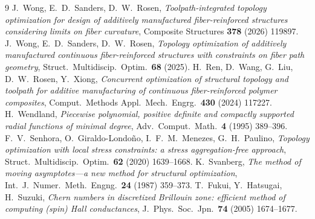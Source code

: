 \documentclass[11pt]{article}
\begin{document}
\begin{thebibliography}{9}
 J.~Wong, E.~D.~Sanders, D.~W.~Rosen,
  \emph{Toolpath-integrated topology optimization for design of additively
  manufactured fiber-reinforced structures considering limits on fiber
  curvature}, Composite Structures \textbf{378} (2026) 119897.
 J.~Wong, E.~D.~Sanders, D.~W.~Rosen,
  \emph{Topology optimization of additively manufactured continuous
  fiber-reinforced structures with constraints on fiber path geometry},
  Struct.\ Multidiscip.\ Optim.\ \textbf{68} (2025).
 H.~Ren, D.~Wang, G.~Liu, D.~W.~Rosen, Y.~Xiong,
  \emph{Concurrent optimization of structural topology and toolpath for additive
  manufacturing of continuous fiber-reinforced polymer composites}, Comput.\
  Methods Appl.\ Mech.\ Engrg.\ \textbf{430} (2024) 117227.
 H.~Wendland,
  \emph{Piecewise polynomial, positive definite and compactly supported radial
  functions of minimal degree}, Adv.\ Comput.\ Math.\ \textbf{4} (1995) 389--396.
\bibitem{senhora2020} F.~V.~Senhora, O.~Giraldo-Londo\~no, I.~F.~M.~Menezes,
  G.~H.~Paulino, \emph{Topology optimization with local stress constraints: a
  stress aggregation-free approach}, Struct.\ Multidiscip.\ Optim.\ \textbf{62}
  (2020) 1639--1668.
 K.~Svanberg,
  \emph{The method of moving asymptotes---a new method for structural
  optimization}, Int.\ J.\ Numer.\ Meth.\ Engng.\ \textbf{24} (1987) 359--373.
\bibitem{fukui2005} T.~Fukui, Y.~Hatsugai, H.~Suzuki,
  \emph{Chern numbers in discretized Brillouin zone: efficient method of
  computing (spin) Hall conductances}, J.\ Phys.\ Soc.\ Jpn.\ \textbf{74} (2005)
  1674--1677.
\end{thebibliography}
\end{document}
